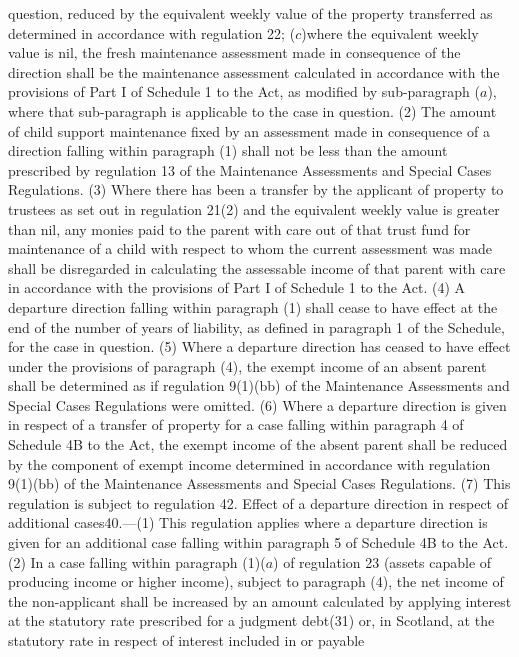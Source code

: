 \documentclass[a4paper]{article}
\begin{document}
question, reduced by the equivalent weekly value of the property transferred as
determined in accordance with regulation 22;
($c$)where the equivalent weekly value is nil, the fresh maintenance assessment
made in consequence of the direction shall be the maintenance assessment
calculated in accordance with the provisions of Part I of Schedule 1 to the Act,
as modified by sub-paragraph ($a$), where that sub-paragraph is applicable to the
case in question.
(2) The amount of child support maintenance fixed by an assessment made in
consequence of a direction falling within paragraph (1) shall not be less than
the amount prescribed by regulation 13 of the Maintenance Assessments and
Special Cases Regulations.
(3) Where there has been a transfer by the applicant of property to trustees as
set out in regulation 21(2) and the equivalent weekly value is greater than nil,
any monies paid to the parent with care out of that trust fund for maintenance
of a child with respect to whom the current assessment was made shall be
disregarded in calculating the assessable income of that parent with care in
accordance with the provisions of Part I of Schedule 1 to the Act.
(4) A departure direction falling within paragraph (1) shall cease to have
effect at the end of the number of years of liability, as defined in paragraph 1
of the Schedule, for the case in question.
(5) Where a departure direction has ceased to have effect under the provisions
of paragraph (4), the exempt income of an absent parent shall be determined as
if regulation 9(1)(bb) of the Maintenance Assessments and Special Cases
Regulations were omitted.
(6) Where a departure direction is given in respect of a transfer of property
for a case falling within paragraph 4 of Schedule 4B to the Act, the exempt
income of the absent parent shall be reduced by the component of exempt income
determined in accordance with regulation 9(1)(bb) of the Maintenance Assessments
and Special Cases Regulations.
(7) This regulation is subject to regulation 42.
Effect of a departure direction in respect of additional cases40.—(1) This
regulation applies where a departure direction is given for an additional case
falling within paragraph 5 of Schedule 4B to the Act.
(2) In a case falling within paragraph (1)($a$) of regulation 23 (assets capable
of producing income or higher income), subject to paragraph (4), the net income
of the non-applicant shall be increased by an amount calculated by applying
interest at the statutory rate prescribed for a judgment debt(31) or, in
Scotland, at the statutory rate in respect of interest included in or payable
\end{document}
